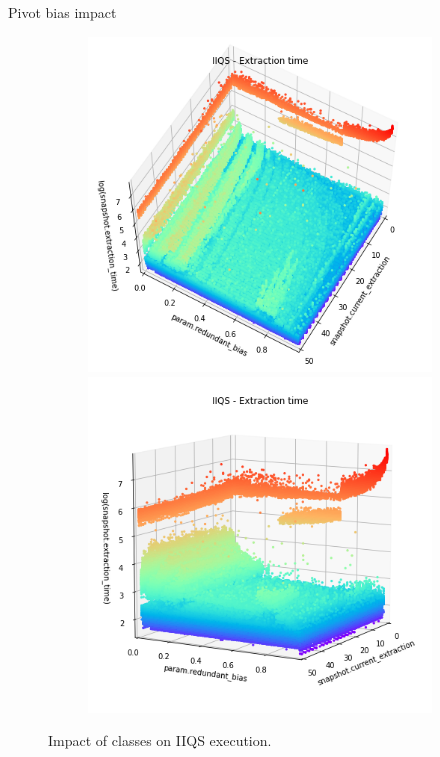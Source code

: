 \documentclass{beamer}
\begin{document}
\begin{frame}{Pivot bias impact}
    \begin{figure}
        \centering
        \begin{subfigure}[b]{\textwidth}
            \centering
            \includegraphics[height=0.6\textheight]{chapter4/01-basebenchmark-07-extraction-bias.png.0-1.png}
            \includegraphics[height=0.6\textheight]{chapter4/01-basebenchmark-07-extraction-bias.png.0-2.png}
        \end{subfigure}
        \caption{Impact of classes on IIQS execution.}
    \end{figure}
\end{frame}
\end{document}
